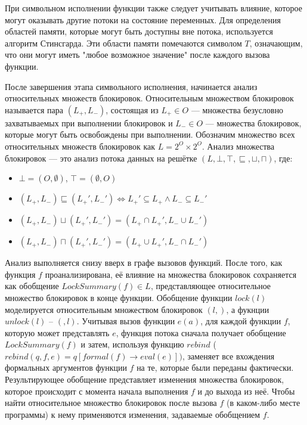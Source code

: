 При символьном исполнении функции также следует учитывать влияние, которое могут оказывать другие потоки на состояние переменных. Для определения областей памяти, которые могут быть доступны вне потока, используется алгоритм Стинсгарда. Эти области памяти помечаются символом $T$, означающим, что они могут иметь "любое возможное значение" после каждого вызова функции.

После завершения этапа символьного исполнения, начинается анализ относительных множеств блокировок. Относительным множеством блокировок называется пара $(L_{+}, L_{-})$, состоящая из $L_{+} \in O$ — множества безусловно захватываемых при выполнении блокировок и $L_{-} \in O$ — множества блокировок, которые могут быть освобождены при выполнении. Обозначим множество всех относительных множеств блокировок как $L = 2^{O} \times 2^{O}$. Анализ множества блокировок — это анализ потока данных на решётке $(L, \bot, \top, \sqsubseteq, \sqcup, \sqcap)$, где:
\begin{itemize}
\item $\bot = (O, \emptyset)$, $\top = (\emptyset, O)$
\item $(L_{+}, L_{-}) \sqsubseteq (L_{+}', L_{-}') \Longleftrightarrow L_{+}' \subseteq L_{+} \wedge L_{-} \subseteq L_{-}'$
\item $(L_{+}, L_{-}) \sqcup (L_{+}', L_{-}') = (L_{+} \cap L_{+}', L_{-} \cup L_{-}')$
\item $(L_{+}, L_{-}) \sqcap (L_{+}', L_{-}') = (L_{+} \cup L_{+}', L_{-} \cap L_{-}')$
\end{itemize}

Анализ выполняется снизу вверх в графе вызовов функций. После того, как функция $f$  проанализирована, её влияние на множества блокировок сохраняется как обобщение $LockSummary(f) \in L$, представляющее относительное множество блокировок в конце функции. Обобщение функции $lock(l)$  моделируется относительным множеством блокировок $({l}, {})$, а фукнции $unlock(l)$ – $({}, {l})$. Учитывая вызов функции $e(a)$, для каждой функции $f$, которую может представлять $e$, функция потока сначала получает обобщение $LockSummary(f)$ и затем, используя функцию $rebind$ ($rebind(q, f, e) = q[formal(f ) → eval(e)])$, заменяет все вхождения формальных аргументов функции $f$ на те, которые были переданы фактически. Результирующее обобщение представляет изменения множества блокировок, которое происходит с момента начала выполнения $f$ и до выхода из неё. Чтобы найти относительное множество блокировок после вызова $f$ (в каком-либо месте программы) к нему применяются изменения, задаваемые обобщением $f$.

